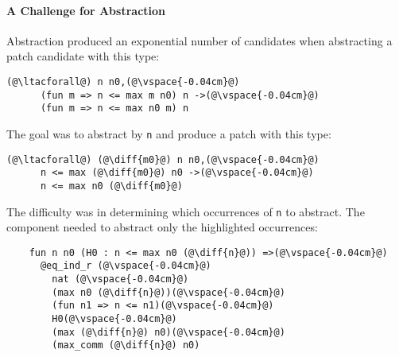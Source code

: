 \paragraph{A Challenge for Abstraction} Abstraction produced an exponential number of candidates when abstracting a patch candidate with this type:

\begin{lstlisting}[language=coq]
    (@\ltacforall@) n n0,(@\vspace{-0.04cm}@)
      (fun m => n <= max m n0) n ->(@\vspace{-0.04cm}@)
      (fun m => n <= max n0 m) n
\end{lstlisting}

The goal was to abstract by \lstinline{n} and produce a patch with this type:

\begin{lstlisting}[language=coq]
    (@\ltacforall@) (@\diff{m0}@) n n0,(@\vspace{-0.04cm}@)
      n <= max (@\diff{m0}@) n0 ->(@\vspace{-0.04cm}@)
      n <= max n0 (@\diff{m0}@)
\end{lstlisting}


The difficulty was in determining which occurrences of \lstinline{n} to abstract.
The component needed to abstract only the highlighted occurrences:

\begin{lstlisting}
    fun n n0 (H0 : n <= max n0 (@\diff{n}@)) =>(@\vspace{-0.04cm}@)
      @eq_ind_r (@\vspace{-0.04cm}@)
        nat (@\vspace{-0.04cm}@)
        (max n0 (@\diff{n}@))(@\vspace{-0.04cm}@)
        (fun n1 => n <= n1)(@\vspace{-0.04cm}@)
        H0(@\vspace{-0.04cm}@)
        (max (@\diff{n}@) n0)(@\vspace{-0.04cm}@)
        (max_comm (@\diff{n}@) n0)
\end{lstlisting}

